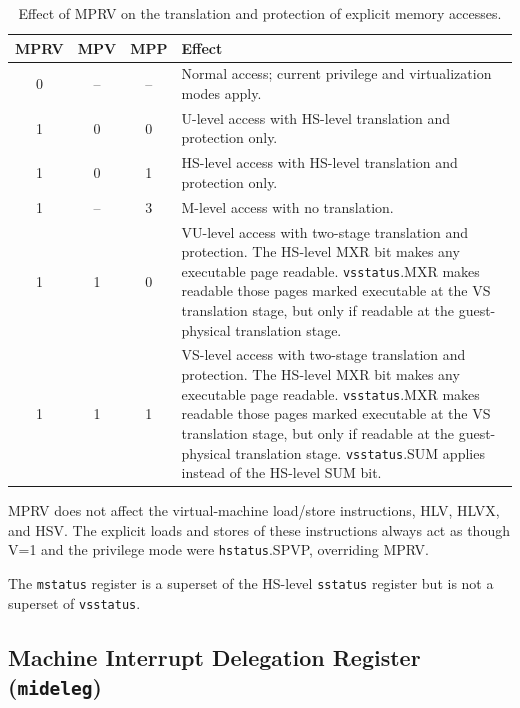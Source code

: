 \begin{table}[h!]
\begin{center}
\begin{tabular}{|c|c|c||p{4.5in}|}
  \hline
   MPRV & MPV & MPP & Effect \\ \hline \hline
   0    & --  & --  & Normal access; current privilege and virtualization modes apply. \\ \hline
   1    & 0   & 0   & U-level access with HS-level translation and protection only. \\ \hline
   1    & 0   & 1   & HS-level access with HS-level translation and protection only.  \\ \hline
   1    & --  & 3   & M-level access with no translation. \\ \hline
   1    & 1   & 0   & VU-level access with two-stage translation and protection. The HS-level MXR bit makes any executable page readable.  {\tt vsstatus}.MXR makes readable those pages marked executable at the VS translation stage, but only if readable at the guest-physical translation stage. \\ \hline
   1    & 1   & 1   & VS-level access with two-stage translation and protection. The HS-level MXR bit makes any executable page readable.  {\tt vsstatus}.MXR makes readable those pages marked executable at the VS translation stage, but only if readable at the guest-physical translation stage.  {\tt vsstatus}.SUM applies instead of the HS-level SUM bit. \\ \hline
 \end{tabular}
\end{center}
\caption{Effect of MPRV on the translation and protection of explicit
memory accesses.}
\label{h-mprv}
\end{table}

MPRV does not affect the virtual-machine load/store instructions, HLV,
HLVX, and HSV.
The explicit loads and stores of these instructions always act as though
V=1 and the privilege mode were {\tt hstatus}.SPVP, overriding MPRV.

The {\tt mstatus} register is a superset of the HS-level {\tt sstatus}
register but is not a superset of {\tt vsstatus}.

\FloatBarrier

\subsection{Machine Interrupt Delegation Register ({\tt mideleg})}

